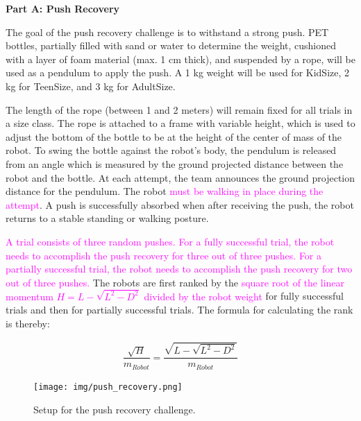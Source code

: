 \clearpage
\sffamily
{\bfseries\color[rgb]{0.4,0.4,0.4}
Part A: Push Recovery }

\bigskip

The goal of the push recovery challenge is to withstand a strong push. PET bottles, partially filled with sand or water to determine the weight, cushioned with a layer of foam material (max. 1 cm thick), and suspended by a rope, will be used as a pendulum to apply the push. A 1 kg weight will be used for KidSize, 2 kg for TeenSize, and 3 kg for AdultSize. 

The length of the rope (between 1 and 2 meters) will remain fixed for all trials in a size class. The rope is attached to a frame with variable height, which is used to adjust the bottom of the bottle to be at the height of the center of mass of the robot. To swing the bottle against the robot's body, the pendulum is released from an angle which is measured by the ground projected distance between the robot and the bottle. At each attempt, the team announces the ground projection distance for the pendulum. The robot \textcolor{magenta}{must be walking in place during the attempt}. A push is successfully absorbed when after receiving the push, the robot returns to a stable standing or walking posture. 

\textcolor{magenta}{A trial consists of three random pushes. For a fully successful trial, the robot needs to accomplish the push recovery for three out of three pushes. For a partially successful trial, the robot needs to accomplish the push recovery for two out of three pushes.} The robots are first ranked by the \textcolor{magenta}{square root of the linear momentum $H = L - \sqrt{L^{2} - D^{2}}$ divided by the robot weight} for fully successful trials and then for partially successful trials. The formula for calculating the rank is thereby:

\begin{align*}
\dfrac{\sqrt{H}}{m_{Robot}} =  \dfrac{\sqrt{L - \sqrt{L^{2} - D^{2}}}}{m_{Robot}}
\end{align*}

\begin{figure}[h]
\begin{center}
\texttt{[image: img/push\_recovery.png]}
\caption{Setup for the push recovery challenge. }
\end{center}
\end{figure}